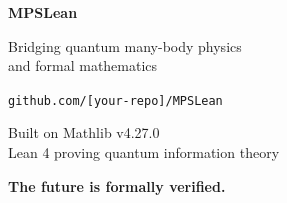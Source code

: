 \documentclass[aspectratio=169,10pt]{beamer}
\begin{document}
\begin{frame}
\begin{center}
\Huge\textbf{\textcolor{leangreen}{MPSLean}}

\vspace{1em}
\Large Bridging quantum many-body physics\\and formal mathematics

\vspace{2em}
\LARGE\texttt{github.com/[your-repo]/MPSLean}

\vspace{1em}
\large Built on Mathlib v4.27.0\\
Lean 4 proving quantum information theory

\vspace{2em}
\textbf{\textcolor{leangreen}{The future is formally verified.}}
\end{center}
\end{frame}
\end{document}
